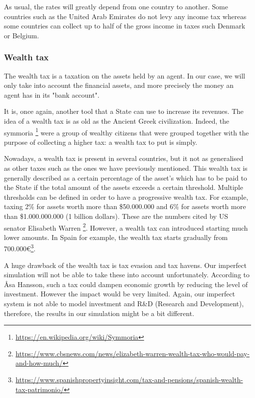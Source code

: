     As usual, the rates will greatly depend from one country to another. Some countries such as the United Arab Emirates do not levy any income tax whereas some countries can collect up to half of the gross income in taxes such Denmark or Belgium.
    
    \subsubsection{Wealth tax}\label{section:wealth_tax}
    
    The wealth tax is a taxation on the assets held by an agent. In our case, we will only take into account the financial assets, and more precisely the money an agent has in its "bank account".
    
    It is, once again, another tool that a State can use to increase its revenues. The idea of a wealth tax is as old as the Ancient Greek civilization. Indeed, the symmoria \footnote{\url{https://en.wikipedia.org/wiki/Symmoria}} were a group of wealthy citizens that were grouped together with the purpose of collecting a higher tax: a wealth tax to put is simply.
    
    Nowadays, a wealth tax is present in several countries, but it not as generalised as other taxes such as the ones we have previously mentioned. This wealth tax is generally described as a certain percentage of the asset's which has to be paid to the State if the total amount of the assets exceeds a certain threshold. Multiple thresholds can be defined in order to have a progressive wealth tax. For example, taxing 2\% for assets worth more than \$50.000.000 and 6\% for assets worth more than \$1.000.000.000 (1 billion dollars). These are the numbers cited by US senator Elisabeth Warren \footnote{\url{https://www.cbsnews.com/news/elizabeth-warren-wealth-tax-who-would-pay-and-how-much/}}. However, a wealth tax can introduced starting much lower amounts. In Spain for example, the wealth tax starts gradually from 700.000\euro \footnote{\url{https://www.spanishpropertyinsight.com/tax-and-pensions/spanish-wealth-tax-patrimonio/}}.
    
    A huge drawback of the wealth tax is tax evasion and tax havens. Our imperfect simulation will not be able to take these into account unfortunately. According to Åsa Hansson, such a tax could dampen economic growth by reducing the level of investment. However the impact would be very limited.\cite{hansson2010wealth} Again, our imperfect system is not able to model investment and R\&D (Research and Development), therefore, the results in our simulation might be a bit different.



